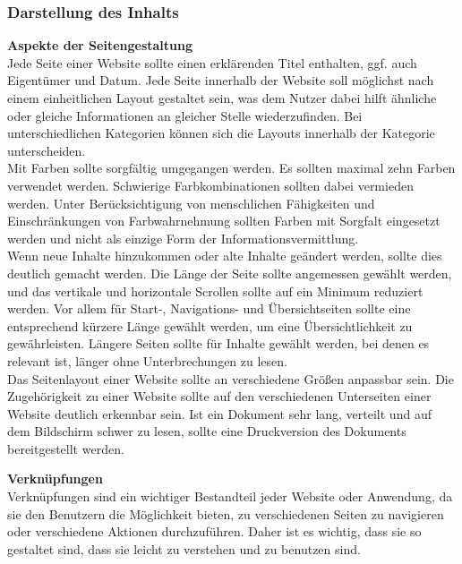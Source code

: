 \documentclass[utf8,biblatex]{lni}
\begin{document}
\subsubsection{Darstellung des Inhalts}
\textbf{Aspekte der Seitengestaltung}\\
Jede Seite einer Website sollte einen erklärenden Titel enthalten, ggf. auch Eigentümer und Datum. Jede Seite innerhalb der Website soll möglichst nach einem einheitlichen Layout gestaltet sein, was dem Nutzer dabei hilft ähnliche oder gleiche Informationen an gleicher Stelle wiederzufinden. Bei unterschiedlichen Kategorien können sich die Layouts innerhalb der Kategorie unterscheiden. \\
Mit Farben sollte sorgfältig umgegangen werden. Es sollten maximal zehn Farben verwendet werden. Schwierige Farbkombinationen sollten dabei vermieden werden. Unter Berücksichtigung von menschlichen Fähigkeiten und Einschränkungen von Farbwahrnehmung sollten Farben mit Sorgfalt eingesetzt werden und nicht als einzige Form der Informationsvermittlung.\\
Wenn neue Inhalte hinzukommen oder alte Inhalte geändert werden, sollte dies deutlich gemacht werden. Die Länge der Seite sollte angemessen gewählt werden, und das vertikale und horizontale Scrollen sollte auf ein Minimum reduziert werden. Vor allem für Start-, Navigations- und Übersichtseiten sollte eine entsprechend kürzere Länge gewählt werden, um eine Übersichtlichkeit zu gewährleisten. Längere Seiten sollte für Inhalte gewählt werden, bei denen es relevant ist, länger ohne Unterbrechungen zu lesen.\\
Das Seitenlayout einer Website sollte an verschiedene Größen anpassbar sein. Die Zugehörigkeit zu einer Website sollte auf den verschiedenen Unterseiten einer Website deutlich erkennbar sein. Ist ein Dokument sehr lang, verteilt und auf dem Bildschirm schwer zu lesen, sollte eine Druckversion des Dokuments bereitgestellt werden.

\textbf{Verknüpfungen}\\
Verknüpfungen sind ein wichtiger Bestandteil jeder Website oder Anwendung, da sie den Benutzern die Möglichkeit bieten, zu verschiedenen Seiten zu navigieren oder verschiedene Aktionen durchzuführen. Daher ist es wichtig, dass sie so gestaltet sind, dass sie leicht zu verstehen und zu benutzen sind.
\end{document}
